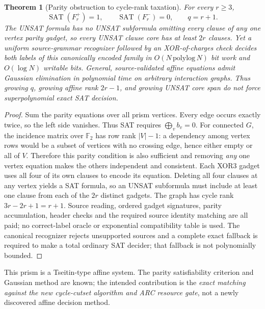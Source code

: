 \documentclass[11pt]{article}
\newtheorem{theorem}{Theorem}
\newcommand{\SAT}{\mathop{\mathrm{SAT}}}
\begin{document}
\begin{theorem}[Parity obstruction to cycle-rank taxation]
For every $r\ge3$,
\[
 \SAT(F_r^+)=1,\qquad \SAT(F_r^-)=0,\qquad q=r+1.
\]
The UNSAT formula has no UNSAT subformula omitting every clause of any one vertex parity gadget, so every UNSAT clause core has at least $2r$ clauses. Yet a uniform source-grammar recognizer followed by an XOR-of-charges check decides \emph{both labels} of this canonically encoded family in $O(N\,\mathrm{polylog}\,N)$ bit work and $O(\log N)$ writable bits. General, source-validated affine equations admit Gaussian elimination in polynomial time on arbitrary interaction graphs. Thus growing $q$, growing affine rank $2r-1$, and growing UNSAT core span do not force superpolynomial exact SAT decision.
\end{theorem}
\begin{proof}
Sum the parity equations over all prism vertices. Every edge occurs exactly twice, so the left side vanishes. Thus SAT requires $\bigoplus_v b_v=0$. For connected $G$, the incidence matrix over $\mathbb F_2$ has row rank $|V|-1$: a dependency among vertex rows would be a subset of vertices with no crossing edge, hence either empty or all of $V$. Therefore this parity condition is also sufficient and removing \emph{any} one vertex equation makes the others independent and consistent. Each XOR3 gadget uses all four of its own clauses to encode its equation. Deleting all four clauses at any vertex yields a SAT formula, so an UNSAT subformula must include at least one clause from each of the $2r$ distinct gadgets. The graph has cycle rank $3r-2r+1=r+1$. Source reading, ordered gadget signatures, parity accumulation, header checks and the required source identity matching are all paid; no correct-label oracle or exponential compatibility table is used. The canonical recognizer rejects unsupported sources and a complete exact fallback is required to make a total ordinary SAT decider; that fallback is not polynomially bounded. \end{proof}
This prism is a Tseitin-type affine system. The parity satisfiability criterion and Gaussian method are known; the intended contribution is the \emph{exact matching against the new cycle-cutset algorithm and ARC resource gate}, not a newly discovered affine decision method.
\end{document}

